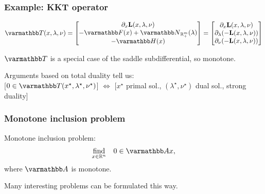 \documentclass[10pt,mathserif]{beamer}
\begin{document}
\begin{frame}
\frametitle{Example: KKT operator}
\[
\opT (x, \lambda,\nu) = \begin{bmatrix} \partial_x \lagrange(x, \lambda,\nu) \\ -\opF(x)+\opN_{{\reals_+^m}}(\lambda)\\-\opH(x) \end{bmatrix}
=
\begin{bmatrix} \partial_x \lagrange(x, \lambda,\nu) \\
\partial_\lambda(-\lagrange(x, \lambda,\nu))\\
\partial_\nu(-\lagrange(x, \lambda,\nu))
 \end{bmatrix}
\]

\vspace{0.2in}
$\opT $ is a special case of the saddle subdifferential, so monotone.

\vspace{0.2in}


Arguments based on total duality tell us:\\

[$0\in \opT (x^\star,\lambda^\star,\nu^\star)$]
$\Leftrightarrow$
[$x^\star$ primal sol.,
$(\lambda^\star,\nu^\star)$ dual sol., strong duality]
\end{frame}

\begin{frame}
\frametitle{Monotone inclusion problem}
Monotone inclusion problem:
\[
\begin{array}{ll}
\underset{x\in \reals^n}{\mbox{find}}&0\in \opA x,
\end{array}
\]
where $\opA$ is monotone.

\vspace{0.2in}
Many interesting problems can be formulated this way.
\end{frame}
\end{document}
